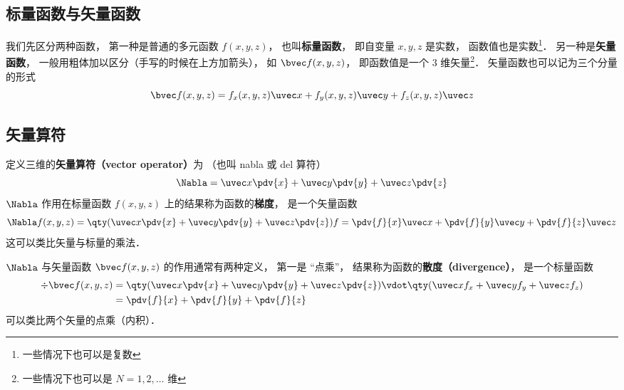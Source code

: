 

\subsection{标量函数与矢量函数}
我们先区分两种函数， 第一种是普通的多元函数 $f(x, y, z)$， 也叫\textbf{标量函数}， 即自变量 $x, y, z$ 是实数， 函数值也是实数\footnote{一些情况下也可以是复数}． 另一种是\textbf{矢量函数}， 一般用粗体加以区分（手写的时候在上方加箭头）， 如 $\bvec f(x, y, z)$， 即函数值是一个 3 维矢量\footnote{一些情况下也可以是 $N = 1, 2, \dots$ 维}． 矢量函数也可以记为三个分量的形式
\begin{equation}
\bvec f(x, y, z) = f_x(x, y, z) \uvec x + f_y(x, y, z) \uvec y + f_z(x, y, z) \uvec z
\end{equation}

\subsection{矢量算符}
定义三维的\textbf{矢量算符（vector operator）}为 （也叫 nabla 或 del 算符）
\begin{equation}
\Nabla = \uvec x \pdv{x} + \uvec y \pdv{y} + \uvec z \pdv{z}
\end{equation}
$\Nabla$ 作用在标量函数 $f(x, y, z)$ 上的结果称为函数的\textbf{梯度}， 是一个矢量函数
\begin{equation}
\Nabla f(x, y, z) = \qty(\uvec x \pdv{x} + \uvec y \pdv{y} + \uvec z \pdv{z}) f = \pdv{f}{x} \uvec x + \pdv{f}{y} \uvec y + \pdv{f}{z} \uvec z
\end{equation}
这可以类比矢量与标量的乘法．

$\Nabla$ 与矢量函数 $\bvec f(x, y, z)$ 的作用通常有两种定义， 第一是 “点乘”， 结果称为函数的\textbf{散度（divergence）}， 是一个标量函数
\begin{equation}\label{VecOp_eq1}
\begin{aligned}
\div \bvec f(x, y, z) &= \qty(\uvec x \pdv{x} + \uvec y \pdv{y} + \uvec z \pdv{z}) \vdot \qty(\uvec x f_x + \uvec y f_y + \uvec z f_z)\\
&= \pdv{f}{x} + \pdv{f}{y} + \pdv{f}{z}
\end{aligned}
\end{equation}
可以类比两个矢量的点乘（内积）．

